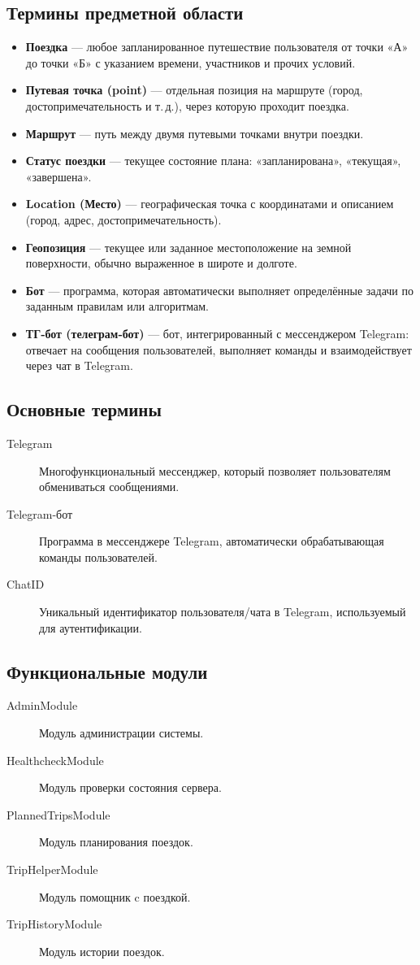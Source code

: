 \documentclass[areasetadvanced]{scrartcl}
\begin{document}
\subsection{Термины предметной области}
\begin{itemize}
  \item \textbf{Поездка} --- любое запланированное путешествие пользователя от точки «А» до точки «Б» с указанием времени, участников и прочих условий.
  \item \textbf{Путевая точка (point)} --- отдельная позиция на маршруте (город, достопримечательность и т.\,д.), через которую проходит поездка.
  \item \textbf{Маршрут} --- путь между двумя путевыми точками внутри поездки.
  \item \textbf{Статус поездки} --- текущее состояние плана: «запланирована», «текущая», «завершена».
  \item \textbf{Location (Место)} --- географическая точка с координатами и описанием (город, адрес, достопримечательность).
  \item \textbf{Геопозиция} --- текущее или заданное местоположение на земной поверхности, обычно выраженное в широте и долготе.
  \item \textbf{Бот} --- программа, которая автоматически выполняет определённые задачи по заданным правилам или алгоритмам.
  \item \textbf{ТГ‑бот (телеграм‑бот)} --- бот, интегрированный с мессенджером Telegram: отвечает на сообщения пользователей, выполняет команды и взаимодействует через чат в Telegram.
\end{itemize}
\subsection{Основные термины}
\begin{description}
\item[Telegram] Многофункциональный мессенджер, который позволяет
  пользователям обмениваться сообщениями.
\item[Telegram-бот] Программа в мессенджере Telegram, автоматически
  обрабатывающая команды пользователей.
\item[ChatID] Уникальный идентификатор пользователя/чата в Telegram,
  используемый для аутентификации.
\end{description}
\subsection{Функциональные модули}
\begin{description}
\item[AdminModule] Модуль администрации системы.
\item[HealthcheckModule] Модуль проверки состояния сервера.
\item[PlannedTripsModule] Модуль планирования поездок.
\item[TripHelperModule] Модуль помощник c поездкой.
\item[TripHistoryModule] Модуль истории поездок.
\end{description}
\end{document}
